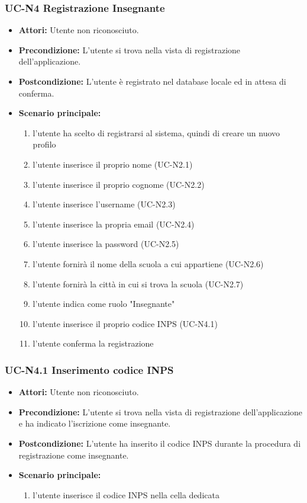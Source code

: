 \subsubsection{UC-N4 Registrazione Insegnante}
\begin{itemize}
	\item \textbf{Attori: }Utente non riconosciuto.
	\item \textbf{Precondizione: }L'utente si trova nella vista di registrazione dell'applicazione.
	\item \textbf{Postcondizione: }L'utente è registrato nel database locale ed in attesa di conferma.
	\item \textbf{Scenario principale: }
		\begin{enumerate}
		\item l'utente ha scelto di registrarsi al sistema, quindi di creare un nuovo profilo
		\item l'utente inserisce il proprio nome (UC-N2.1)
		\item l'utente inserisce il proprio cognome (UC-N2.2)
		\item l'utente inserisce l'username (UC-N2.3)
		\item l'utente inserisce la propria email (UC-N2.4)
		\item l'utente inserisce la password (UC-N2.5)
		\item l'utente fornirà il nome della scuola a cui appartiene (UC-N2.6)
		\item l'utente fornirà la città in cui si trova la scuola (UC-N2.7)
		\item l'utente indica come ruolo "Insegnante"
		\item l'utente inserisce il proprio codice INPS (UC-N4.1)
		\item l'utente conferma la registrazione
		\end{enumerate}
\end{itemize}

\subsubsection{UC-N4.1 Inserimento codice INPS}
\begin{itemize}
	\item \textbf{Attori: }Utente non riconosciuto.
	\item \textbf{Precondizione: }L'utente si trova nella vista di registrazione dell'applicazione e ha indicato l'iscrizione come insegnante.
	\item \textbf{Postcondizione: }
		L'utente ha inserito il codice INPS durante la procedura di registrazione come insegnante.
		\item \textbf{Scenario principale:}
		\begin{enumerate}
			\item l'utente inserisce il codice INPS nella cella dedicata
		\end{enumerate}
\end{itemize}

